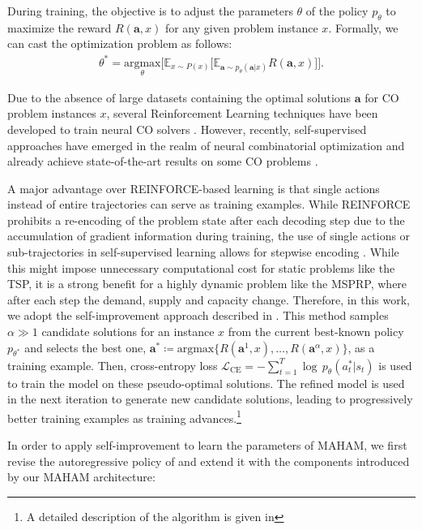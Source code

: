 \label{sec:training}
During training, the objective is to adjust the parameters $\theta$ of the policy $p_\theta$ to maximize the reward $R(\bm{a}, x)$ for any given problem instance $x$. Formally, we can cast the optimization problem as follows:
%
\begin{align}
\label{eq:training_problem_simple_ar}
    \theta^{*}=\underset{\theta}{\text{argmax}} 
    \Big[
    \mathbb{E}_{x \sim P(x)}\big[\mathbb{E}_{\bm{a} \sim p_\theta(\bm{a}|x)}R(\bm{a},x)\big] 
    \Big].
\end{align}
%

Due to the absence of large datasets containing the optimal solutions $\bm{a}$ for CO problem instances $x$, several Reinforcement Learning techniques have been developed to train neural CO solvers \cite{koolBuyREINFORCESamples2019,kwonPOMOPolicyOptimization2021,kim2022sym}. However, recently, self-supervised approaches have emerged in the realm of neural combinatorial optimization and already achieve state-of-the-art results on some CO problems \cite{pirnay2024selfimprovement,SelfJSP}. 

A major advantage over REINFORCE-based learning is that single actions instead of entire trajectories can serve as training examples. While REINFORCE prohibits a re-encoding of the problem state after each decoding step due to the accumulation of gradient information during training, the use of single actions or sub-trajectories in self-supervised learning allows for stepwise encoding \cite{pirnay2024selfimprovement}. 
While this might impose unnecessary computational cost for static problems like the TSP, it is a strong benefit for a highly dynamic problem like the MSPRP, where after each step the demand, supply and capacity change. Therefore, in this work, we adopt the self-improvement approach described in \cite{pirnay2024selfimprovement}. This method samples $\alpha \gg 1$ candidate solutions for an instance $x$ from the current best-known policy $p_{\theta^\ast}$ and selects the best one, $\bm{a}^\ast \coloneq \text{argmax} \{R(\bm{a}^1, x), \ldots, R(\bm{a}^\alpha, x)\}$, as a training example. Then, cross-entropy loss $\mathcal{L}_{\text{CE}} = - \sum_{t=1}^T \log \, p_\theta (a^\ast_t | s_t)$ is used to train the model on these pseudo-optimal solutions. The refined model is used in the next iteration to generate new candidate solutions, leading to progressively better training examples as training advances.\footnote{A detailed description of the algorithm is given in }

In order to apply self-improvement to learn the parameters of MAHAM, we first revise the autoregressive policy of  and extend it with the components introduced by our MAHAM architecture: 

